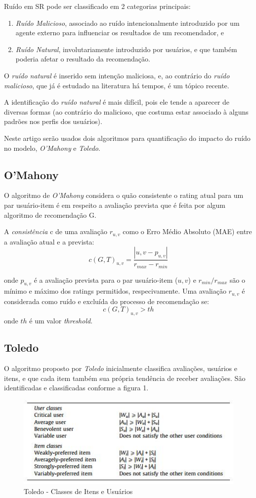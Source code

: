 \documentclass{sig-alternate}
\begin{document}
Ruído em SR pode ser classificado em 2 categorias principais:
\begin{enumerate}
	\item \emph{Ruído Malicioso}, associado ao ruído intencionalmente introduzido por um agente externo para influenciar os resultados de um recomendador, e
	\item \emph{Ruído Natural}, involutariamente introduzido por usuários, e que também poderia afetar o resultado da recomendação.
\end{enumerate}
	
O \emph{ruído natural} é inserido sem intenção maliciosa, e, ao contrário do \emph{ruído malicioso}, que já é estudado na literatura há tempos, é um tópico recente.
	
A identificação do \emph{ruído natural} é mais difícil, pois ele tende a aparecer de diversas formas (ao contrário do malicioso, que costuma estar associado à alguns padrões nos perfis dos usuários).
	
Neste artigo serão usados dois algoritmos para quantificação do impacto do ruído no modelo, \emph{O'Mahony} e \emph{Toledo}.

\subsection{O'Mahony}
O algoritmo de \emph{O'Mahony} considera o quão consistente o rating atual para um par usuário-item é em respeito a avaliação prevista que é feita por algum algoritmo de recomendação G.
 
A \emph{consistência} c de uma avaliação $r_{u,v}$ como o Erro Médio Absoluto (MAE) entre a avaliação atual e a prevista:
	$$ c(G,T)_{u,v} = \frac{|{u,v} - p_{u,v}|}{r_{max} - r_{min}} $$

onde $p_{u,v}$ é a avaliação prevista para o par usuário-item ($u,v$) e $r_{min}/r_{max}$ são o mínimo e máximo dos ratings permitidos, respecivamente. Uma avaliação $r_{u,v}$ é considerada como ruído e excluída do processo de recomendação se:
$$ c(G,T)_{u,v} > th $$
onde $th$ é um valor \emph{threshold}.
\subsection{Toledo}
O algoritmo proposto por \emph{Toledo} inicialmente classifica avaliações, usuários e itens, e que cada item também sua própria tendência de receber avaliações. São identificadas e classificadas conforme a figura 1.

\begin{figure}[h]
\centering
\includegraphics[width=1.0\linewidth]{table_toledo}
\caption{Toledo - Classes de Itens e Usuários}
\label{Figura 1}
\end{figure}
\end{document}
